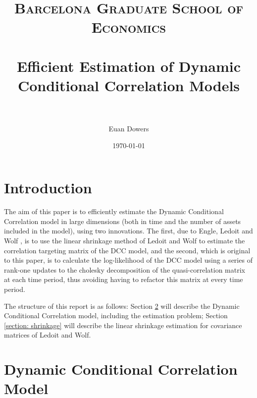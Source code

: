\documentclass{article} %
\title{
\normalfont \normalsize
\textsc{Barcelona Graduate School of Economics} \\ [20pt] %
\horrule{0.5pt} \\[0.1cm] %
\Large Efficient Estimation of Dynamic Conditional Correlation Models \\ %
\horrule{0.5pt} \\[0.1cm] %
}
\author{Euan Dowers} %
\date{\normalsize\today} %
\numberwithin{equation}{section} %
\numberwithin{figure}{section} %
\numberwithin{table}{section} %
\begin{document}
\maketitle %

\tableofcontents

\pagebreak


\section{Introduction}

The aim of this paper is to efficiently estimate the Dynamic Conditional Correlation model in large dimensions (both in time and the number of assets included in the model), using two innovations. The first, due to Engle, Ledoit and Wolf \cite{engle ledoit and wolf}, is to use the linear shrinkage method of Ledoit and Wolf \cite{ledoit and wolf} to estimate the correlation targeting matrix of the DCC model, and the second, which is original to this paper, is to calculate the log-likelihood of the DCC model using a series of rank-one updates to the cholesky decomposition of the quasi-correlation matrix at each time period, thus avoiding having to refactor this matrix at every time period.

The structure of this report is as follows: Section \ref{section: dcc} will describe the Dynamic Conditional Correlation model, including the estimation problem; Section \ref{section: shrinkage} will describe the linear shrinkage estimation for covariance matrices of Ledoit and Wolf.


\section{Dynamic Conditional Correlation Model} \label{section: dcc}
\end{document}
